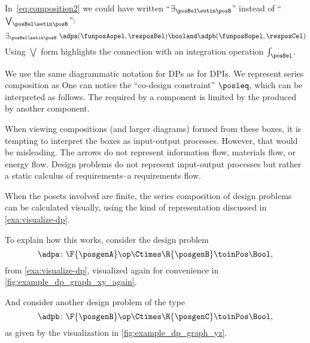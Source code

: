 In~\cref{eq:composition2} we could have written ``$\exists_{\posBel\setin \posB}$'' instead of ``$\bigvee_{\posBel\setin \posB}$'':
\begin{equation}
    \exists_{\posBel \setin \posB}\  \adpa(\funposAopel,\resposBel) \booland \adpb(\funposBopel,\resposCel)
\end{equation}
Using $\bigvee$ form highlights the connection with an integration operation $\int_\posBel$.

We use the same diagrammatic notation for DPs as for DPIs.
We represent series composition as
%
%
One can notice the ``co-design constraint'' $\posleq$, which can be interpreted as follows.
The  required by a component is limited by the  produced by another component.

When viewing compositions (and larger diagrams) formed from these boxes, it is tempting to interpret the boxes as input-output processes.
However, that would be misleading.
The arrows do not represent information flow, materials flow, or energy flow.
Design problems do not represent input-output processes but rather a static calculus of requirements--a requirements flow.

When the posets involved are finite, the series composition of design problems can be calculated visually, using the kind of representation discussed in \cref{exa:visualize-dp}.

To explain how this works, consider the design problem
\begin{equation}
    \adpa \colon \F{\posgenA} \op \Ctimes  \R{\posgenB} \toinPos \Bool,
\end{equation}
from \cref{exa:visualize-dp}, visualized again for convenience in \cref{fig:example_dp_graph_xy_again}.

And consider another design problem of the type
\begin{equation}
    \adpb \colon \F{\posgenB} \op \Ctimes  \R{\posgenC} \toinPos \Bool,
\end{equation}
as given by the visualization in \cref{fig:example_dp_graph_yz}.

